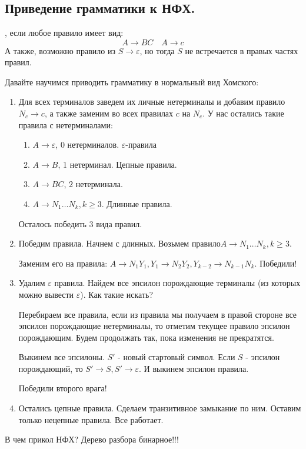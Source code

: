 \subsection{Приведение грамматики к НФХ.}

, если любое правило имеет вид:
$$A \xrightarrow{} BC \quad A \xrightarrow{} c$$
А также, возможно правило из $S\xrightarrow{} \varepsilon$, но тогда $S$ не встречается в правых частях правил.

Давайте научимся приводить грамматику в нормальный вид Хомского:
\begin{enumerate}
    \item Для всех терминалов заведем их личные нетерминалы и добавим правило $N_c \xrightarrow{ }c$, а также заменим во всех правилах $c$ на $N_c$. У нас остались такие правила с нетерминалами: 
    \begin{enumerate}
        \item $A \xrightarrow{} \varepsilon$, 0 нетерминалов. $\varepsilon$-правила
        \item $A \xrightarrow{} B$, 1 нетерминал. Цепные правила.
        \item $A \xrightarrow{} BC$, 2 нетерминала.
        \item $A \xrightarrow{} N_1\ldots N_k, k \geq 3$. Длинные правила.
    \end{enumerate}
    Осталось победить 3 вида правил.
    \item Победим правила. Начнем с длинных. Возьмем правило$A \xrightarrow{} N_1\ldots N_k, k \geq 3$. 
    
    Заменим его на правила:
    $A \xrightarrow{} N_1 Y_1, Y_1 \xrightarrow{} N_2 Y_2, Y_{k-2}\xrightarrow{} N_{k-1}N_k$. Победили!

    \item Удалим $\varepsilon$ правила. Найдем все эпсилон порождающие терминалы (из которых можно вывести $\varepsilon$). Как такие искать?

    Перебираем все правила, если из правила мы получаем в правой стороне все эпсилон порождающие нетерминалы, то отметим текущее правило эпсилон порождающим. Будем продолжать так, пока изменения не прекратятся. 

    Выкинем все эпсилоны. $S'$ - новый стартовый символ. Если $S$ - эпсилон порождающий, то $S'\xrightarrow{} S, S'\xrightarrow{} \varepsilon$. И выкинем эпсилон правила.

    Победили второго врага!
    \item Остались цепные правила. Сделаем транзитивное замыкание по ним. Оставим только нецепные правила. Все работает.
\end{enumerate}
В чем прикол НФХ? Дерево разбора бинарное!!!    

